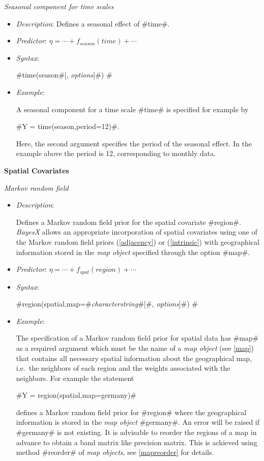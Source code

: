 {\em Seasonal component for time scales}

\begin{itemize}
\item[] {\em Description}: Defines a seasonal effect of #time#.
\item[] {\em Predictor}: $\eta =  \cdots + f_{season}(time) + \cdots $
\item[] {\em Syntax}:

#time(season#[, {\em options}]#) #
\item[] {\em Example}:

A seasonal component for a time scale #time# is specified for
example by

#Y = time(season,period=12)#.

Here, the second argument specifies the period of the seasonal
effect. In the example above the period is 12, corresponding to
monthly data.
\end{itemize}


{\bf Spatial Covariates}
\medskip

{\em Markov random field}

\begin{itemize}
\item[] {\em Description}:

Defines a Markov random field prior for the spatial covariate
#region#. {\em BayesX} allows an appropriate incorporation of
spatial covariates using one of the Markov random field priors
(\ref{adjacency}) or (\ref{intrinsic}) with geographical
information stored in the {\em map object} specified through the
option #map#.
\item[] {\em Predictor}: $\eta = \cdots + f_{spat}(region) + \cdots$
\item[] {\em Syntax}:

#region(spatial,map=#{\em characterstring}#[#{\em , options}]#) #
\item[] {\em Example}:

The specification of a Markov random field prior for spatial data
has #map# as a required argument which must be the name of a {\em
map object} (see \autoref{map}) that contains all necessary
spatial information about the geographical map, i.e.~the neighbors
of each region and the weights associated with the neighbors. For
example the statement

#Y = region(spatial,map=germany)#

defines a Markov random field prior for #region# where the
geographical information is stored in the {\em map object}
#germany#. An error will be raised if #germany# is not existing.
It is advisable to reorder the regions of a map in advance to
obtain a band matrix like precision matrix. This is achieved using
method #reorder# of {\em map objects}, see \autoref{mapreorder}
for details.
\end{itemize}



